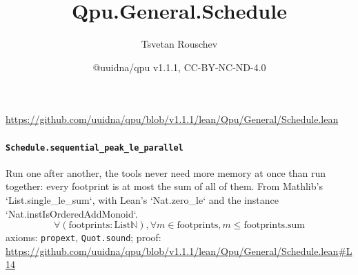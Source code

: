 \documentclass[11pt]{article}
\title{Qpu.General.Schedule}
\author{Tsvetan Rouschev}
\date{@uuidna/qpu v1.1.1, CC-BY-NC-ND-4.0}
\begin{document}
\maketitle
\noindent\url{https://github.com/uuidna/qpu/blob/v1.1.1/lean/Qpu/General/Schedule.lean}

\paragraph{\texttt{Schedule.sequential\_peak\_le\_parallel}}
Run one after another, the tools never need more memory at once than run together: every footprint is at most the sum of all of them. From Mathlib's `List.single\_le\_sum`, with Lean's `Nat.zero\_le` and the instance `Nat.instIsOrderedAddMonoid`.
\[ \forall (\mathrm{footprints} : \mathrm{List} \mathbb{N}), \forall m \in \mathrm{footprints}, m \le \mathrm{footprints.sum} \]
\noindent axioms: \texttt{propext}, \texttt{Quot.sound}; proof: \url{https://github.com/uuidna/qpu/blob/v1.1.1/lean/Qpu/General/Schedule.lean\#L14}
\end{document}
